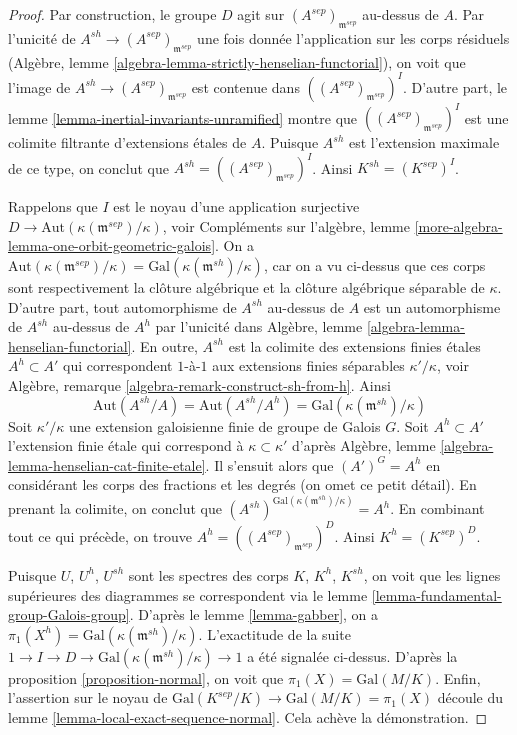 \begin{proof}
Par construction, le groupe $D$ agit sur $(A^{sep})_{\mathfrak m^{sep}}$
au-dessus de $A$. Par l'unicité de $A^{sh} \to (A^{sep})_{\mathfrak m^{sep}}$
une fois donnée l'application sur les corps résiduels
(Algèbre, lemme \ref{algebra-lemma-strictly-henselian-functorial}),
on voit que l'image de $A^{sh} \to (A^{sep})_{\mathfrak m^{sep}}$
est contenue dans $((A^{sep})_{\mathfrak m^{sep}})^I$.
D'autre part, le
lemme \ref{lemma-inertial-invariants-unramified}
montre que $((A^{sep})_{\mathfrak m^{sep}})^I$
est une colimite filtrante d'extensions étales de $A$.
Puisque $A^{sh}$ est l'extension maximale de ce type, on conclut
que $A^{sh} = ((A^{sep})_{\mathfrak m^{sep}})^I$.
Ainsi $K^{sh} = (K^{sep})^I$.

\medskip\noindent
Rappelons que $I$ est le noyau d'une application surjective
$D \to \text{Aut}(\kappa(\mathfrak m^{sep})/\kappa)$, voir
Compléments sur l'algèbre, lemme \ref{more-algebra-lemma-one-orbit-geometric-galois}.
On a $\text{Aut}(\kappa(\mathfrak m^{sep})/\kappa) =
\text{Gal}(\kappa(\mathfrak m^{sh})/\kappa)$,
car on a vu ci-dessus que ces corps sont respectivement la clôture algébrique
et la clôture algébrique séparable de $\kappa$.
D'autre part, tout automorphisme de $A^{sh}$ au-dessus de $A$
est un automorphisme de $A^{sh}$ au-dessus de $A^h$ par l'unicité
dans Algèbre, lemme \ref{algebra-lemma-henselian-functorial}.
En outre, $A^{sh}$ est la colimite des extensions finies étales
$A^h \subset A'$ qui correspondent $1$-à-$1$
aux extensions finies séparables $\kappa'/\kappa$, voir
Algèbre, remarque \ref{algebra-remark-construct-sh-from-h}.
Ainsi
$$
\text{Aut}(A^{sh}/A) = \text{Aut}(A^{sh}/A^h) =
\text{Gal}(\kappa(\mathfrak m^{sh})/\kappa)
$$
Soit $\kappa'/\kappa$ une extension galoisienne finie de
groupe de Galois $G$. Soit $A^h \subset A'$ l'extension finie étale
qui correspond à $\kappa \subset \kappa'$ d'après
Algèbre, lemme \ref{algebra-lemma-henselian-cat-finite-etale}.
Il s'ensuit alors que
$(A')^G = A^h$ en considérant les corps des fractions et les degrés
(on omet ce petit détail). En prenant la colimite, on conclut que
$(A^{sh})^{\text{Gal}(\kappa(\mathfrak m^{sh})/\kappa)} = A^h$.
En combinant tout ce qui précède, on trouve $A^h = ((A^{sep})_{\mathfrak m^{sep}})^D$.
Ainsi $K^h = (K^{sep})^D$.

\medskip\noindent
Puisque $U$, $U^h$, $U^{sh}$ sont les spectres des corps
$K$, $K^h$, $K^{sh}$, on voit que les lignes supérieures des diagrammes
se correspondent via le
lemme \ref{lemma-fundamental-group-Galois-group}.
D'après le lemme \ref{lemma-gabber}, on a
$\pi_1(X^h) = \text{Gal}(\kappa(\mathfrak m^{sh})/\kappa)$.
L'exactitude de la suite
$1 \to I \to D \to \text{Gal}(\kappa(\mathfrak m^{sh})/\kappa) \to 1$
a été signalée ci-dessus.
D'après la proposition \ref{proposition-normal},
on voit que $\pi_1(X) = \text{Gal}(M/K)$.
Enfin, l'assertion sur le noyau de
$\text{Gal}(K^{sep}/K) \to \text{Gal}(M/K) = \pi_1(X)$
découle du lemme \ref{lemma-local-exact-sequence-normal}.
Cela achève la démonstration.
\end{proof}

